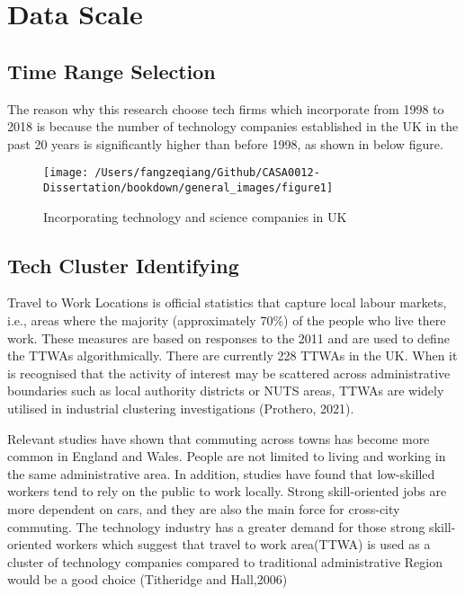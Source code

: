 \documentclass[
  12pt,
  oneside]{book}
\begin{document}
\hypertarget{data-scale}{%
\section{Data Scale}\label{data-scale}}

\hypertarget{time-range-selection}{%
\subsection{Time Range Selection}\label{time-range-selection}}

The reason why this research choose tech firms which incorporate from 1998 to 2018 is because the number of technology companies established in the UK in the past 20 years is significantly higher than before 1998, as shown in below figure.

\begin{figure}
\texttt{[image: /Users/fangzeqiang/Github/CASA0012-Dissertation/bookdown/general\_images/figure1]} \caption{Incorporating technology and science companies in UK}\label{fig:fig-1}
\end{figure}

\hypertarget{tech-cluster-identifying}{%
\subsection{Tech Cluster Identifying}\label{tech-cluster-identifying}}

Travel to Work Locations is official statistics that capture local labour markets, i.e., areas where the majority (approximately 70\%) of the people who live there work. These measures are based on responses to the 2011 and are used to define the TTWAs algorithmically. There are currently 228 TTWAs in the UK. When it is recognised that the activity of interest may be scattered across administrative boundaries such as local authority districts or NUTS areas, TTWAs are widely utilised in industrial clustering investigations (Prothero, 2021).

Relevant studies have shown that commuting across towns has become more common in England and Wales. People are not limited to living and working in the same administrative area. In addition, studies have found that low-skilled workers tend to rely on the public to work locally. Strong skill-oriented jobs are more dependent on cars, and they are also the main force for cross-city commuting. The technology industry has a greater demand for those strong skill-oriented workers which suggest that travel to work area(TTWA) is used as a cluster of technology companies compared to traditional administrative Region would be a good choice (Titheridge and Hall,2006)
\end{document}
